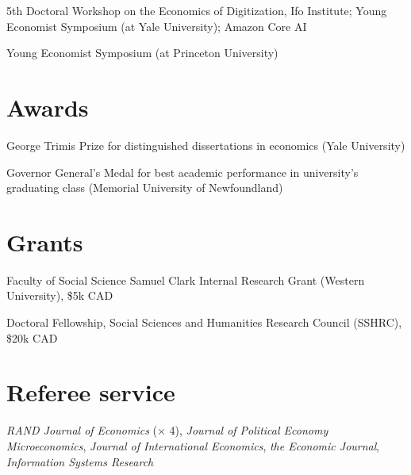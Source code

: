 \documentclass[11pt]{article} %
\begin{document}
 5th Doctoral Workshop on the Economics of Digitization, Ifo Institute; 
	Young Economist Symposium (at Yale University); Amazon Core AI


 Young Economist Symposium (at Princeton University)

\section*{Awards}

 George Trimis Prize for distinguished dissertations in economics (Yale University)

 Governor General's Medal for best academic performance in university's graduating class
	(Memorial University of Newfoundland)

\section*{Grants}

 Faculty of Social Science Samuel Clark Internal Research Grant (Western University), \$5k CAD

  Doctoral Fellowship, Social Sciences and Humanities Research Council (SSHRC), \$20k CAD


\section*{Referee service}

\textit{RAND Journal of Economics} ($\times$ 4), \textit{Journal of Political Economy Microeconomics},
\textit{Journal of International Economics}, \textit{the Economic Journal},
\textit{Information Systems Research}


%
%
%
\end{document}

